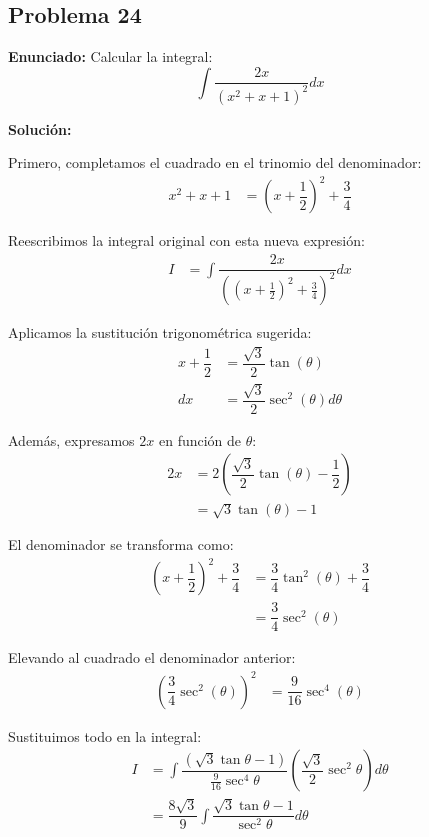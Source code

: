 \subsection*{Problema 24}

\textbf{Enunciado:} Calcular la integral:
\begin{equation*}
\int \dfrac{2x}{(x^2 + x + 1)^2} dx
\end{equation*}

\textbf{Solución:}

Primero, completamos el cuadrado
en el trinomio del denominador:
\begin{align*}
x^2 + x + 1 &= \left(x + \dfrac{1}{2}\right)^2 + \dfrac{3}{4}
\end{align*}

Reescribimos la integral original
con esta nueva expresión:
\begin{align*}
I &= \int \dfrac{2x}{\left(\left(x + \frac{1}{2}\right)^2 + \frac{3}{4}\right)^2} dx
\end{align*}

Aplicamos la sustitución trigonométrica
sugerida:
\begin{align*}
x + \dfrac{1}{2} &= \dfrac{\sqrt{3}}{2}\tan(\theta) \\
dx &= \dfrac{\sqrt{3}}{2}\sec^2(\theta) d\theta
\end{align*}

Además, expresamos $2x$ en función
de $\theta$:
\begin{align*}
2x &= 2\left(\dfrac{\sqrt{3}}{2}\tan(\theta) - \dfrac{1}{2}\right) \\
&= \sqrt{3}\tan(\theta) - 1
\end{align*}

El denominador se transforma como:
\begin{align*}
\left(x + \dfrac{1}{2}\right)^2 + \dfrac{3}{4} &= \dfrac{3}{4}\tan^2(\theta) + \dfrac{3}{4} \\
&= \dfrac{3}{4}\sec^2(\theta)
\end{align*}

Elevando al cuadrado el denominador
anterior:
\begin{align*}
\left(\dfrac{3}{4}\sec^2(\theta)\right)^2 &= \dfrac{9}{16}\sec^4(\theta)
\end{align*}

Sustituimos todo en la integral:
\begin{align*}
I &= \int \dfrac{(\sqrt{3}\tan\theta - 1)}{\frac{9}{16}\sec^4\theta} 
\left(\dfrac{\sqrt{3}}{2}\sec^2\theta\right) d\theta \\
&= \dfrac{8\sqrt{3}}{9} \int \dfrac{\sqrt{3}\tan\theta - 1}{\sec^2\theta} d\theta
\end{align*}

